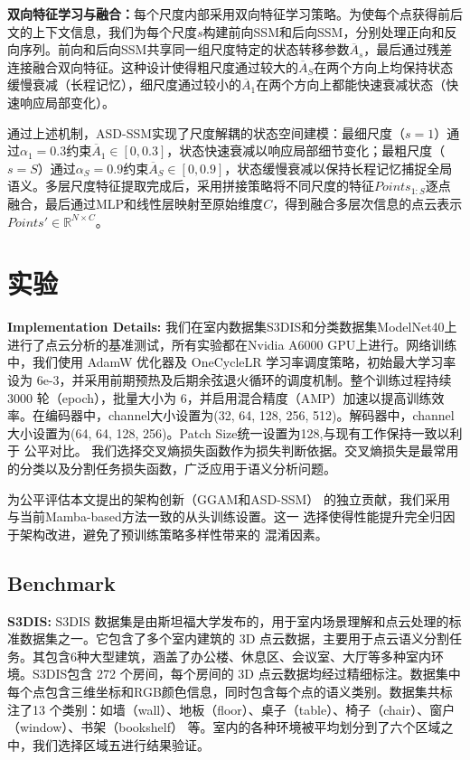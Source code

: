 \documentclass[preprint,12pt]{elsarticle}
\begin{document}
\textbf{双向特征学习与融合：}每个尺度内部采用双向特征学习策略。为使每个点获得前后文的上下文信息，我们为每个尺度$s$构建前向SSM和后向SSM，分别处理正向和反向序列。前向和后向SSM共享同一组尺度特定的状态转移参数$\overline{A}_s$，最后通过残差连接融合双向特征。这种设计使得粗尺度通过较大的$\overline{A}_S$在两个方向上均保持状态缓慢衰减（长程记忆），细尺度通过较小的$\overline{A}_1$在两个方向上都能快速衰减状态（快速响应局部变化）。

通过上述机制，ASD-SSM实现了尺度解耦的状态空间建模：最细尺度（$s=1$）通过$\alpha_1=0.3$约束$\overline{A}_1 \in [0, 0.3]$，状态快速衰减以响应局部细节变化；最粗尺度（$s=S$）通过$\alpha_S=0.9$约束$\overline{A}_S \in [0, 0.9]$，状态缓慢衰减以保持长程记忆捕捉全局语义。多层尺度特征提取完成后，采用拼接策略将不同尺度的特征$Points_{1:S}$逐点融合，最后通过MLP和线性层映射至原始维度$C$，得到融合多层次信息的点云表示$Points'\in\mathbb{R}^{N\times C}$。

\section{实验}
\textbf{Implementation Details:}
我们在室内数据集S3DIS和分类数据集ModelNet40上进行了点云分析的基准测试，所有实验都在Nvidia A6000 GPU上进行。网络训练中，我们使用 AdamW 优化器及 OneCycleLR 学习率调度策略，初始最大学习率设为 6e-3，并采用前期预热及后期余弦退火循环的调度机制。整个训练过程持续 3000 轮（epoch），批量大小为 6，并启用混合精度（AMP）加速以提高训练效率。在编码器中，channel大小设置为(32, 64, 128, 256, 512)。解码器中，channel大小设置为(64, 64, 128, 256)。Patch Size统一设置为128,与现有工作保持一致以利于
公平对比。
我们选择交叉熵损失函数作为损失判断依据。交叉熵损失是最常用的分类以及分割任务损失函数，广泛应用于语义分析问题。

为公平评估本文提出的架构创新（GGAM和ASD-SSM）
的独立贡献，我们采用与当前Mamba-based方法一致的从头训练设置。这一
选择使得性能提升完全归因于架构改进，避免了预训练策略多样性带来的
混淆因素。


\subsection{Benchmark}
\textbf{S3DIS:}
S3DIS 数据集是由斯坦福大学发布的，用于室内场景理解和点云处理的标准数据集之一。它包含了多个室内建筑的 3D 点云数据，主要用于点云语义分割任务。其包含6种大型建筑，涵盖了办公楼、休息区、会议室、大厅等多种室内环境。S3DIS包含 272 个房间，每个房间的 3D 点云数据均经过精细标注。数据集中每个点包含三维坐标和RGB颜色信息，同时包含每个点的语义类别。数据集共标注了13 个类别：如墙（wall）、地板（floor）、桌子（table）、椅子（chair）、窗户（window）、书架（bookshelf） 等。室内的各种环境被平均划分到了六个区域之中，我们选择区域五进行结果验证。
\end{document}
